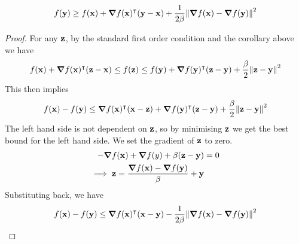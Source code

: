 \begin{claim}
	\[
		f(\vb y) \geq f(\vb x) + \grad{f(\vb x)}^\intercal (\vb y - \vb x) + \frac{1}{2\beta} \norm{\grad{f(\vb x) - \grad{f(\vb y)}}}^2
	\]
\end{claim}
\begin{proof}
	For any \(\vb z\), by the standard first order condition and the corollary above we have
	\[
		f(\vb x) + \grad{f(\vb x)}^\intercal (\vb z - \vb x) \leq f(\vb z) \leq f(\vb y) + \grad{f(\vb y)}^\intercal (\vb z - \vb y) + \frac{\beta}{2}\norm{\vb z - \vb y}^2
	\]
	This then implies
	\[
		f(\vb x) - f(\vb y) \leq \grad{f(\vb x)}^\intercal (\vb x - \vb z) + \grad{f(\vb y)}^\intercal (\vb z - \vb y) + \frac{\beta}{2}\norm{\vb z - \vb y}^2
	\]
	The left hand side is not dependent on \(\vb z\), so by minimising \(\vb z\) we get the best bound for the left hand side.
	We set the gradient of \(\vb z\) to zero.
	\begin{align*}
		-\grad{f(\vb x)} + \grad{f(y)} + \beta (\vb z - \vb y) & = 0 \\
		\implies \vb z = \frac{\grad{f(\vb x) - \grad{f(\vb y)}}}{\beta} + \vb y
	\end{align*}
	Substituting back, we have
	\[
		f(\vb x) - f(\vb y) \leq \grad{f(\vb x)}^\intercal (\vb x - \vb y) - \frac{1}{2\beta} \norm{\grad{f(\vb x) - \grad{f(\vb y)}}}^2
	\]
\end{proof}

